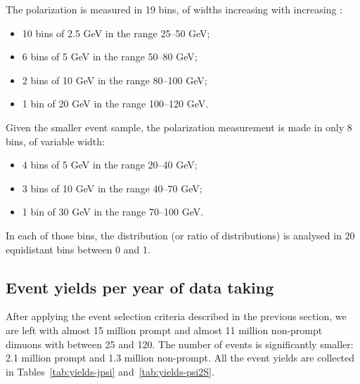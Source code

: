 The \jpsi polarization is measured in 19 \pt bins, of widths increasing with increasing \pt:
\begin{itemize}
\item 10 bins of 2.5 GeV in the range 25--50 GeV;
\item 6 bins of 5 GeV in the range 50--80 GeV;
\item 2 bins of 10 GeV in the range 80--100 GeV;
\item 1 bin of 20 GeV in the range 100--120 GeV.
\end{itemize}

Given the smaller event sample, 
the \psip polarization measurement is made in only 8 \pt bins, of variable width:
\begin{itemize}
\item 4 bins of 5 GeV in the range 20--40 GeV;
\item 3 bins of 10 GeV in the range 40--70 GeV;
\item 1 bin of 30 GeV in the range 70--100 GeV.
\end{itemize}

In each of those \pt bins, the \abscosth distribution (or ratio of distributions) 
is analysed in 20 equidistant bins between 0 and 1.

\vfill\newpage

\subsection{Event yields per year of data taking}
\label{sec:yields}

After applying the event selection criteria described in the previous section, 
we are left with almost 15 million prompt and almost 11 million non-prompt 
\jpsi dimuons with \pt between 25 and 120\GeV. 
The number of \psip events is significantly smaller: 
2.1 million prompt and 1.3 million non-prompt.
All the event yields are collected in Tables~\ref{tab:yields-jpsi} and~\ref{tab:yields-psi2S}.

